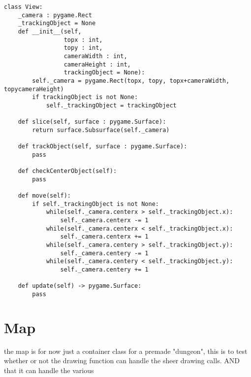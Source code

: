 \documentclass[11pt]{article}
\begin{document}
\begin{verbatim}
class View:
    _camera : pygame.Rect
    _trackingObject = None
    def __init__(self,
                 topx : int,
                 topy : int,
                 cameraWidth : int,
                 cameraHeight : int,
                 trackingObject = None):
        self._camera = pygame.Rect(topx, topy, topx+cameraWidth, topycameraHeight)
        if trackingObject is not None:
            self._trackingObject = trackingObject

    def slice(self, surface : pygame.Surface):
        return surface.Subsurface(self._camera)

    def trackObject(self, surface : pygame.Surface):
        pass

    def checkCenterObject(self):
        pass

    def move(self):
        if self._trackingObject is not None:
            while(self._camera.centerx > self._trackingObject.x):
                self._camera.centerx -= 1
            while(self._camera.centerx < self._trackingObject.x):
                self._camera.centerx += 1
            while(self._camera.centery > self._trackingObject.y):
                self._camera.centery -= 1
            while(self._camera.centery < self._trackingObject.y):
                self._camera.centery += 1

    def update(self) -> pygame.Surface:
        pass
\end{verbatim}


\section{Map}
\label{sec:orgc048359}

the map is for now just a container class for a premade "dungeon", this is to test whether or not the drawing function can handle the sheer drawing calls. AND that it can handle the various 
\end{document}
